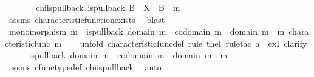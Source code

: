 \begin{isabellebody}
%
\isadelimproof
%
\endisadelimproof
%
\isatagproof
{}\isamarkupfalse%
\ {\isacharminus}{\kern0pt}\isanewline
\ \ \isamarkupfalse%
\ {\isasymchi}\ \ chi{\isacharunderscore}{\kern0pt}is{\isacharunderscore}{\kern0pt}pullback{\isacharcolon}{\kern0pt}\ {\isachardoublequoteopen}is{\isacharunderscore}{\kern0pt}pullback\ B\ {\isasymone}\ X\ {\isasymOmega}\ {\isacharparenleft}{\kern0pt}{\isasymbeta}\isactrlbsub B\isactrlesub {\isacharparenright}{\kern0pt}\ {\isasymt}\ m\ {\isasymchi}{\isachardoublequoteclose}\isanewline
\ \ \ \ \isamarkupfalse%
\ assms\ characteristic{\isacharunderscore}{\kern0pt}function{\isacharunderscore}{\kern0pt}exists\ \isamarkupfalse%
\ blast\isanewline
\isanewline
\ \ \isamarkupfalse%
\ {\isachardoublequoteopen}monomorphism\ m\ {\isasymlongrightarrow}\ is{\isacharunderscore}{\kern0pt}pullback\ {\isacharparenleft}{\kern0pt}domain\ m{\isacharparenright}{\kern0pt}\ {\isasymone}\ {\isacharparenleft}{\kern0pt}codomain\ m{\isacharparenright}{\kern0pt}\ {\isasymOmega}\ {\isacharparenleft}{\kern0pt}{\isasymbeta}\isactrlbsub domain\ m\isactrlesub {\isacharparenright}{\kern0pt}\ {\isasymt}\ m\ {\isacharparenleft}{\kern0pt}characteristic{\isacharunderscore}{\kern0pt}func\ m{\isacharparenright}{\kern0pt}{\isachardoublequoteclose}\isanewline
\ \ \isamarkupfalse%
\ {\isacharparenleft}{\kern0pt}unfold\ characteristic{\isacharunderscore}{\kern0pt}func{\isacharunderscore}{\kern0pt}def{\isacharcomma}{\kern0pt}\ rule\ theI{\isacharprime}{\kern0pt}{\isacharcomma}{\kern0pt}\ rule{\isacharunderscore}{\kern0pt}tac\ a{\isacharequal}{\kern0pt}{\isasymchi}\ \ ex{}I{\isacharcomma}{\kern0pt}\ clarify{\isacharparenright}{\kern0pt}\isanewline
\ \ \ \ \isamarkupfalse%
\ {\isachardoublequoteopen}is{\isacharunderscore}{\kern0pt}pullback\ {\isacharparenleft}{\kern0pt}domain\ m{\isacharparenright}{\kern0pt}\ {\isasymone}\ {\isacharparenleft}{\kern0pt}codomain\ m{\isacharparenright}{\kern0pt}\ {\isasymOmega}\ {\isacharparenleft}{\kern0pt}{\isasymbeta}\isactrlbsub domain\ m\isactrlesub {\isacharparenright}{\kern0pt}\ {\isasymt}\ m\ {\isasymchi}{\isachardoublequoteclose}\isanewline
\ \ \ \ \ \ \isamarkupfalse%
\ assms{\isacharparenleft}{\kern0pt}{}{\isacharparenright}{\kern0pt}\ cfunc{\isacharunderscore}{\kern0pt}type{\isacharunderscore}{\kern0pt}def\ chi{\isacharunderscore}{\kern0pt}is{\isacharunderscore}{\kern0pt}pullback\ \isamarkupfalse%
\ auto\isanewline
\ \ \ \ \isamarkupfalse%

\end{isabellebody}
